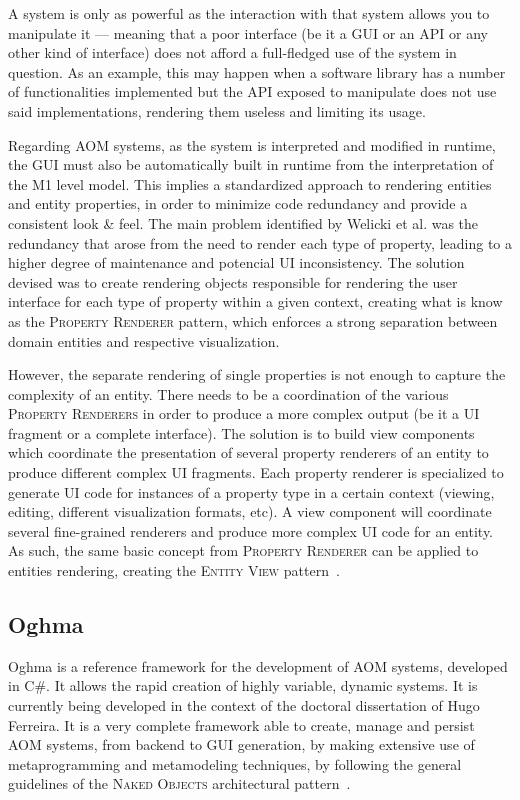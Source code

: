 A system is only as powerful as the interaction with that system allows you to manipulate it --- meaning that a poor interface (be it a GUI or an API or any other kind of interface) does not afford a full-fledged use of the system in question. As an example, this may happen when a software library has a number of functionalities implemented but the API exposed to manipulate does not use said implementations, rendering them useless and limiting its usage.

Regarding AOM systems, as the system is interpreted and modified in runtime, the GUI must also be automatically built in runtime from the interpretation of the M1 level model. This implies a standardized approach to rendering entities and entity properties, in order to minimize code redundancy and provide a consistent look \& feel. The main problem identified by Welicki et al.\cite{WYW07} was the redundancy that arose from the need to render each type of property, leading to a higher degree of maintenance and potencial UI inconsistency. The solution devised was to create rendering objects responsible for rendering the user interface for each type of property within a given context, creating what is know as the \textsc{Property Renderer} pattern, which enforces a strong separation between domain entities and respective visualization.

However, the separate rendering of single properties is not enough to capture the complexity of an entity. There needs to be a coordination of the various \textsc{Property Renderers} in order to produce a more complex output (be it a UI fragment or a complete interface). The solution is to build view components which coordinate the presentation of several property renderers of an entity to produce different complex UI fragments. Each property renderer is specialized to generate UI code for instances of a property type in a certain context (viewing, editing, different visualization formats, etc). A view component will coordinate several fine-grained renderers and produce more complex UI code for an entity. As such, the same basic concept from \textsc{Property Renderer} can be applied to entities rendering, creating the \textsc{Entity View} pattern~\cite{WYW07}.

\subsection{Oghma}\label{sec:oghma}

Oghma is a reference framework for the development of AOM systems, developed in C\#. It allows the rapid creation of highly variable, dynamic systems. It is currently being developed in the context of the doctoral dissertation of Hugo Ferreira. It is a very complete framework able to create, manage and persist AOM systems, from backend to GUI generation, by making extensive use of metaprogramming and metamodeling techniques, by following the general guidelines of the \textsc{Naked Objects} architectural pattern~\cite{naked_objects}.


